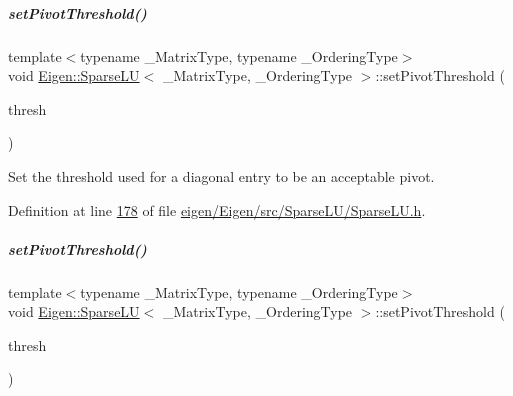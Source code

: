 \mbox{\label{group___sparse_l_u___module_a94c726c9ebb71a60b529fe47d942ad57}} 
\subparagraph{\texorpdfstring{set\+Pivot\+Threshold()}{setPivotThreshold()}\hspace{0.1cm}{\footnotesize\ttfamily [1/2]}}
{\footnotesize\ttfamily template$<$typename \+\_\+\+Matrix\+Type, typename \+\_\+\+Ordering\+Type$>$ \\
void \hyperlink{group___sparse_l_u___module_class_eigen_1_1_sparse_l_u}{Eigen\+::\+Sparse\+LU}$<$ \+\_\+\+Matrix\+Type, \+\_\+\+Ordering\+Type $>$\+::set\+Pivot\+Threshold (\begin{DoxyParamCaption}\item[{const Real\+Scalar \&}]{thresh }\end{DoxyParamCaption})\hspace{0.3cm}{\ttfamily [inline]}}

Set the threshold used for a diagonal entry to be an acceptable pivot. 

Definition at line \hyperlink{eigen_2_eigen_2src_2_sparse_l_u_2_sparse_l_u_8h_source_l00178}{178} of file \hyperlink{eigen_2_eigen_2src_2_sparse_l_u_2_sparse_l_u_8h_source}{eigen/\+Eigen/src/\+Sparse\+L\+U/\+Sparse\+L\+U.\+h}.

\mbox{\label{group___sparse_l_u___module_a94c726c9ebb71a60b529fe47d942ad57}} 
\subparagraph{\texorpdfstring{set\+Pivot\+Threshold()}{setPivotThreshold()}\hspace{0.1cm}{\footnotesize\ttfamily [2/2]}}
{\footnotesize\ttfamily template$<$typename \+\_\+\+Matrix\+Type, typename \+\_\+\+Ordering\+Type$>$ \\
void \hyperlink{group___sparse_l_u___module_class_eigen_1_1_sparse_l_u}{Eigen\+::\+Sparse\+LU}$<$ \+\_\+\+Matrix\+Type, \+\_\+\+Ordering\+Type $>$\+::set\+Pivot\+Threshold (\begin{DoxyParamCaption}\item[{const Real\+Scalar \&}]{thresh }\end{DoxyParamCaption})\hspace{0.3cm}{\ttfamily [inline]}}

